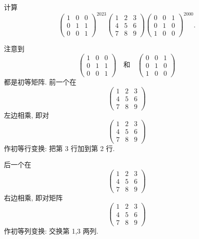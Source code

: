 \documentclass[../../main.tex]{subfiles}%
\begin{document}
\begin{example}
计算
\[
\begin{pmatrix} 
1 & 0 & 0 \\
0 & 1 & 1 \\
0 & 0 & 1 
\end{pmatrix}^{2023} 
\begin{pmatrix} 
1 & 2 & 3 \\
4 & 5 & 6 \\
7 & 8 & 9 
\end{pmatrix} 
\begin{pmatrix} 
0 & 0 & 1 \\
0 & 1 & 0 \\
1 & 0 & 0 
\end{pmatrix}^{2000}.
\]
\end{example}
\begin{solution}

注意到
\[
\begin{pmatrix} 
1 & 0 & 0 \\
0 & 1 & 1 \\
0 & 0 & 1 
\end{pmatrix}
\quad \text{和} \quad
\begin{pmatrix} 
0 & 0 & 1 \\
0 & 1 & 0 \\
1 & 0 & 0 
\end{pmatrix}
\]
都是初等矩阵. 前一个在
\[
\begin{pmatrix} 
1 & 2 & 3 \\
4 & 5 & 6 \\
7 & 8 & 9 
\end{pmatrix}
\]
左边相乘, 即对
\[
\begin{pmatrix} 
1 & 2 & 3 \\
4 & 5 & 6 \\
7 & 8 & 9 
\end{pmatrix}
\]
作初等行变换: 把第 3 行加到第 2 行.

后一个在
\[
\begin{pmatrix} 
1 & 2 & 3 \\
4 & 5 & 6 \\
7 & 8 & 9 
\end{pmatrix}
\]
右边相乘, 即对矩阵
\[
\begin{pmatrix} 
1 & 2 & 3 \\
4 & 5 & 6 \\
7 & 8 & 9 
\end{pmatrix}
\]
作初等列变换: 交换第 1,3 两列.


\end{solution}
\end{document}
